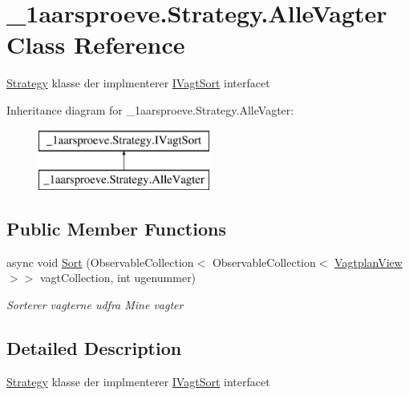 \hypertarget{class__1aarsproeve_1_1_strategy_1_1_alle_vagter}{}\section{\+\_\+1aarsproeve.\+Strategy.\+Alle\+Vagter Class Reference}
\label{class__1aarsproeve_1_1_strategy_1_1_alle_vagter}


\hyperlink{namespace__1aarsproeve_1_1_strategy}{Strategy} klasse der implmenterer \hyperlink{interface__1aarsproeve_1_1_strategy_1_1_i_vagt_sort}{I\+Vagt\+Sort} interfacet  


Inheritance diagram for \+\_\+1aarsproeve.\+Strategy.\+Alle\+Vagter\+:\begin{figure}[H]
\begin{center}
\leavevmode
\includegraphics[height=2.000000cm]{class__1aarsproeve_1_1_strategy_1_1_alle_vagter}
\end{center}
\end{figure}
\subsection*{Public Member Functions}
\begin{DoxyCompactItemize}
\item 
async void \hyperlink{class__1aarsproeve_1_1_strategy_1_1_alle_vagter_a9155c0b6d6353e51c7e9d7c5a926c3f5}{Sort} (Observable\+Collection$<$ Observable\+Collection$<$ \hyperlink{class__1aarsproeve_1_1_model_1_1_vagtplan_view}{Vagtplan\+View} $>$$>$ vagt\+Collection, int ugenummer)
\begin{DoxyCompactList}\small\item\em Sorterer vagterne udfra Mine vagter \end{DoxyCompactList}\end{DoxyCompactItemize}


\subsection{Detailed Description}
\hyperlink{namespace__1aarsproeve_1_1_strategy}{Strategy} klasse der implmenterer \hyperlink{interface__1aarsproeve_1_1_strategy_1_1_i_vagt_sort}{I\+Vagt\+Sort} interfacet 



